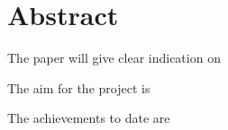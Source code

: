 \chapter*{\Large \center Abstract}
\setlength{\parskip}{\baselineskip}%
\setlength{\parindent}{0pt}%
\begin{flushleft}
The paper will give clear indication on\par

The aim for the project is \par

The achievements to date are 
\end{flushleft}
